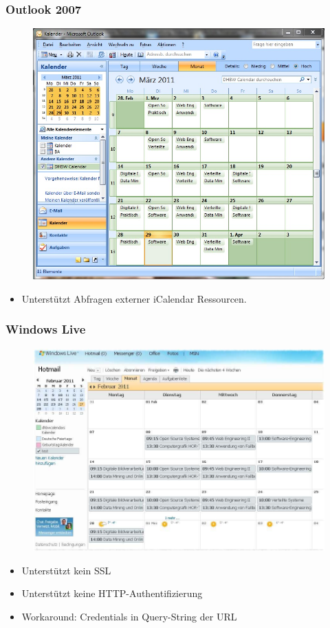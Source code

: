 \documentclass{beamer}
\begin{document}
\begin{frame}\frametitle{Outlook 2007}
  \begin{figure}
    \centering
    \includegraphics[height=0.6\paperheight]{images/dhbwcalendar-outlook2007.jpg}
  \end{figure}
  \begin{itemize}
    \item Unterstützt Abfragen externer iCalendar Ressourcen.
  \end{itemize}
\end{frame}

\begin{frame}\frametitle{Windows Live}
  \begin{figure}
    \centering
    \includegraphics[height=0.6\paperheight]{images/dhbwcalendar-live-web.jpg}
  \end{figure}
  \begin{itemize}
    \item Unterstützt kein SSL
    \item Unterstützt keine HTTP-Authentifizierung
    \item Workaround: Credentials in Query-String der URL
  \end{itemize}
\end{frame}
\end{document}
